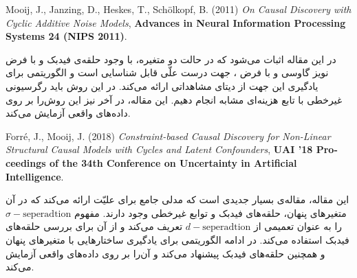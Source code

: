 \documentclass{article}
\begin{document}
\begin{enumerate}
\vspace{1cm}
\begin{latin}
	Mooij, J., Janzing, D., Heskes, T., Sch{\"o}lkopf, B. (2011)
	\textit{On Causal Discovery with Cyclic Additive Noise Models}, \textbf{Advances in Neural Information Processing Systems 24 (NIPS 2011)}.
\end{latin}
در این مقاله‌ اثبات می‌شود که در حالت دو متغیره، با وجود حلقه‌ی فیدبک و با فرض نویز گاوسی و با فرض 
،
جهت درست علّی قابل شناسایی است و الگوریتمی برای یادگیری این جهت از دیتای مشاهداتی ارائه می‌کند.  در این روش باید رگرسیونی غیرخطی با تابع هزینه‌ای مشابه
انجام دهیم. این مقاله، در آخر نیز  این روش‌را بر روی داده‌های واقعی آزمایش می‌کند.

\vspace{1cm}
\begin{latin}
	Forr{\'e}, J., Mooij, J. (2018)
	\textit{Constraint-based Causal Discovery for Non-Linear Structural Causal Models with Cycles and Latent Confounders}, \textbf{UAI '18 Proceedings of the 34th Conference on Uncertainty in Artificial Intelligence}.
\end{latin}
این مقاله، مقاله‌ی بسیار جدیدی است که مدلی جامع برای علیّت ارائه می‌کند که در آن متغیر‌های پنهان، حلقه‌های فیدبک و توابع غیرخطی وجود دارند. مفهوم 
$\sigma-\textrm{seperadtion}$
را به عنوان تعمیمی از 
$d-\textrm{seperadtion}$
تعریف می‌کند و از آن برای بررسی حلقه‌های فیدبک استفاده می‌کند. در ادامه الگوریتمی برای یادگیری ساختارهایی با متغیرهای پنهان و همچنین حلقه‌های فیدبک پیشنهاد می‌کند و آن‌را بر روی داده‌های واقعی آزمایش می‌کند.
\end{enumerate}
\end{document}
